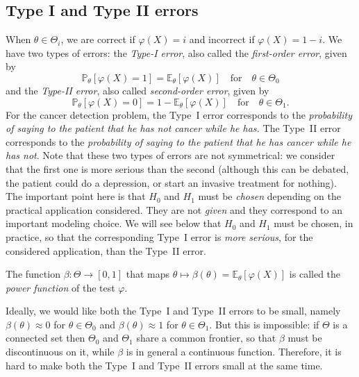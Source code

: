 \documentclass[
	fontsize=11pt, %
	twoside=false, %
	numbers=noenddot, %
]{kaobook}
\renewcommand{\P}{\mathbb P}
\newcommand{\E}{\mathbb E}
\newcommand{\goes}{\rightarrow}
\begin{document}
\subsection{Type I and Type II errors} %


When $\theta \in \Theta_i$, we are correct if $\varphi(X) = i$ and incorrect if $\varphi(X) = 1 - i$.
We have two types of errors: the \emph{Type-I error}, also called the \emph{first-order error}, given by 
\begin{equation}
	\label{eq:type-1-error}
	\P_\theta[ \varphi(X) = 1] = \E_\theta [\varphi(X)] \quad \text{for} \quad
	\theta \in \Theta_0
\end{equation}
and the \emph{Type-II error}, also called \emph{second-order error}, given by 
\begin{equation}
	\label{eq:type-2-error}
	\P_\theta[ \varphi(X) = 0] = 1 - \E_\theta [\varphi(X)] \quad \text{for} \quad 
	\theta \in \Theta_1.
\end{equation}
For the cancer detection problem, the Type~I error corresponds to the \emph{probability of saying to the patient that he has not cancer while he has.}
The Type~II error corresponds to the \emph{probability of saying to the patient that he has cancer while he has not}.
Note that these two types of errors are not symmetrical: we consider that the first one is more serious than the second (although this can be debated, the patient could do a depression, or start an invasive treatment for nothing).%
The important point here is that $H_0$ and $H_1$ must be \emph{chosen} depending on the practical application considered. 
They are not \emph{given} and they correspond to an important modeling choice.
We will see below that $H_0$ and $H_1$ must be chosen, in practice, so that the corresponding Type~I error is \emph{more serious}, for the considered application, than the Type~II error.
\begin{definition}
	\label{def:power-function}
	The function $\beta : \Theta \goes [0, 1]$ that maps $\theta \mapsto \beta(\theta) = \E_\theta [\varphi(X)]$ is called the \emph{power function} of the test $\varphi$.
\end{definition}
Ideally, we would like both the Type~I and Type~II errors to be small, namely $\beta(\theta) \approx 0$ for $\theta \in \Theta_0$ and $\beta(\theta) \approx 1$ for $\theta \in \Theta_1$.
But this is impossible: if $\Theta$ is a connected set then $\Theta_0$ and $\Theta_1$ share a common frontier, so that $\beta$ must be discontinuous on it, while $\beta$ is in general a continuous function.
Therefore, it is hard to make both the Type~I and Type~II errors small at the same time.
\end{document}
